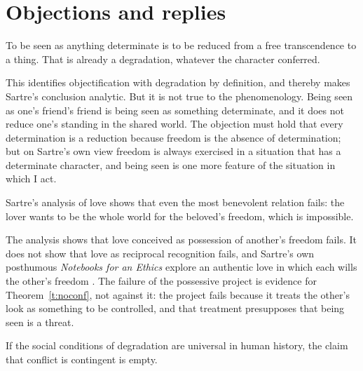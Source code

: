 \documentclass{situationist-preprint}
\begin{document}
\section{Objections and replies}

\begin{objection}\label{o:every}
To be seen as anything determinate is to be reduced from a free transcendence to a thing. That is already a degradation, whatever the character conferred.
\end{objection}

\begin{reply}
This identifies objectification with degradation by definition, and thereby makes Sartre's conclusion analytic. But it is not true to the phenomenology. Being seen as one's friend's friend is being seen as something determinate, and it does not reduce one's standing in the shared world. The objection must hold that every determination is a reduction because freedom is the absence of determination; but on Sartre's own view freedom is always exercised in a situation that has a determinate character, and being seen is one more feature of the situation in which I act.
\end{reply}

\begin{objection}\label{o:love}
Sartre's analysis of love shows that even the most benevolent relation fails: the lover wants to be the whole world for the beloved's freedom, which is impossible.
\end{objection}

\begin{reply}
The analysis shows that love conceived as possession of another's freedom fails. It does not show that love as reciprocal recognition fails, and Sartre's own posthumous \emph{Notebooks for an Ethics} explore an authentic love in which each wills the other's freedom \citep{Sartre1983}. The failure of the possessive project is evidence for Theorem~\ref{t:noconf}, not against it: the project fails because it treats the other's look as something to be controlled, and that treatment presupposes that being seen is a threat.
\end{reply}

\begin{objection}\label{o:cont}
If the social conditions of degradation are universal in human history, the claim that conflict is contingent is empty.
\end{objection}
\end{document}
